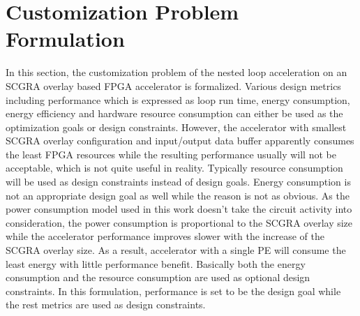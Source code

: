 \section{Customization Problem Formulation}
In this section, the customization problem of the nested loop acceleration on an SCGRA overlay based FPGA accelerator is formalized. Various design metrics including performance which is expressed as loop run time, energy consumption, energy efficiency and hardware resource consumption can either be used as the optimization goals or design constraints. However, the accelerator with smallest SCGRA overlay configuration and input/output data buffer apparently consumes the least FPGA resources while the resulting performance usually will not be acceptable, which is not quite useful in reality. Typically resource consumption will be used as design constraints instead of design goals. Energy consumption is not an appropriate design goal as well while the reason is not as obvious. As the power consumption model used in this work doesn't take the circuit activity into consideration, the power consumption is proportional to the SCGRA overlay size while the accelerator performance improves slower with the increase of the SCGRA overlay size. As a result, accelerator with a single PE will consume the least energy with little performance benefit. Basically both the energy consumption and the resource consumption are used as optional design constraints. In this formulation, performance is set to be the design goal while the rest metrics are used as design constraints. 

